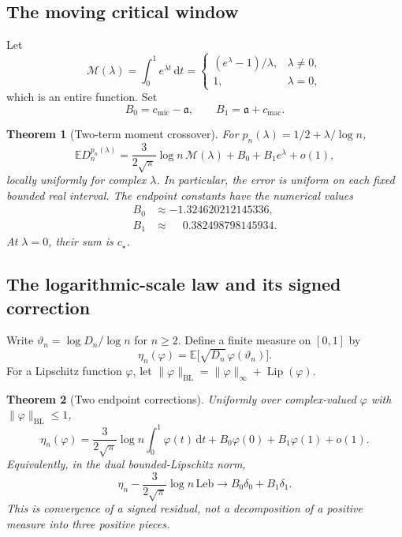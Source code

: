 \documentclass[11pt,a4paper]{article}
\newtheorem{theorem}{Theorem}[section]
\theoremstyle{definition}\newaliascnt{definition}{theorem}
\theoremstyle{remark}\newaliascnt{remark}{theorem}
\newcommand{\dd}{\mathrm d}
\newcommand{\ljE}{\mathbb E}
\newcommand{\cjmic}{c_{\mathrm{mic}}}
\newcommand{\cjmac}{c_{\mathrm{mac}}}
\newcommand{\cjLip}{\operatorname{Lip}}
\newcommand{\cjBL}{\mathrm{BL}}
\newcommand{\cjLeb}{\mathrm{Leb}}
\begin{document}
\subsection{The moving critical window}
Let
\begin{equation}
 \mathcal M(\lambda)=\int_0^1e^{\lambda t}\,\dd t
 =\begin{cases}(e^\lambda-1)/\lambda,&\lambda\ne0,\\1,&\lambda=0,
 \end{cases}
 \label{cjm:eq:Phi}
\end{equation}
which is an entire function. Set
\begin{equation}
 B_0=\cjmic-\mathfrak a,\qquad B_1=\mathfrak a+\cjmac.
 \label{cjm:eq:endpoint-constants}
\end{equation}

\begin{theorem}[Two-term moment crossover]
\label{cjm:thm:crossover}
For $p_n(\lambda)=1/2+\lambda/\log n$,
\begin{equation}
 \ljE D_n^{p_n(\lambda)}
 = \frac3{2\sqrt\pi}\log n\,\mathcal M(\lambda)+B_0+B_1e^\lambda+o(1),
 \label{cjm:eq:crossover}
\end{equation}
locally uniformly for complex $\lambda$. In particular, the error is
uniform on each fixed bounded real interval. The endpoint constants have
the numerical values
\begin{align*}
 B_0&\approx-1.324620212145336,\\
 B_1&\approx\phantom{-}0.382498798145934.
\end{align*}
At $\lambda=0$, their sum is $c_\star$.
\end{theorem}

\subsection{The logarithmic-scale law and its signed correction}
Write $\vartheta_n=\log D_n/\log n$ for $n\ge2$. Define a finite measure on
$[0,1]$ by
\begin{equation}
 \eta_n(\varphi)=\ljE\bigl[\sqrt{D_n}\,\varphi(\vartheta_n)\bigr].
 \label{cjm:eq:eta}
\end{equation}
For a Lipschitz function $\varphi$, let
$\|\varphi\|_{\cjBL}=\|\varphi\|_\infty+\cjLip(\varphi)$.

\begin{theorem}[Two endpoint corrections]
\label{cjm:thm:logmeasure}
Uniformly over complex-valued $\varphi$ with $\|\varphi\|_{\cjBL}\le1$,
\begin{equation}
 \eta_n(\varphi)=\frac3{2\sqrt\pi}\log n\int_0^1\varphi(t)\,\dd t
                +B_0\varphi(0)+B_1\varphi(1)+o(1).
 \label{cjm:eq:measure-expansion}
\end{equation}
Equivalently, in the dual bounded-Lipschitz norm,
\begin{equation}
 \eta_n-\frac3{2\sqrt\pi}\log n\,\cjLeb
       \longrightarrow B_0\delta_0+B_1\delta_1.
 \label{cjm:eq:signed-limit}
\end{equation}
This is convergence of a \emph{signed residual}, not a decomposition of a
positive measure into three positive pieces.
\end{theorem}
\end{document}
